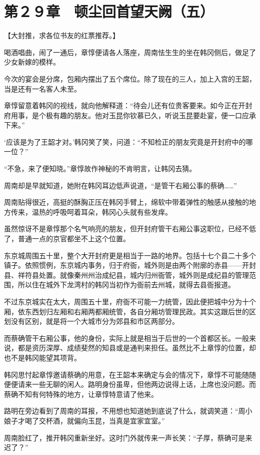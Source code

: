 \section{第２９章　顿尘回首望天阙（五）}

【大封推，求各位书友的红票推荐。】

喝酒唱曲，闹了一通后，章惇便请各人落座，周南怯生生的坐在韩冈侧后，做足了少女新嫁的模样。

今次的宴会是分席，包厢内摆出了五个席位。除了现在的三人，加上入宫的王韶，当是还有一名客人未至。

章惇留意着韩冈的视线，就向他解释道：“待会儿还有位贵客要来。如今正在开封府用事，是个极有趣的朋友。他对玉昆你钦慕已久，听说玉昆要赴宴，便一口应承下来。”

‘应该是为了王韶才对。’韩冈笑了笑，问道：“不知检正的朋友究竟是开封府中的哪一位？”

“不急，来了便知晓。”章惇故作神秘的不肯明言，让韩冈去猜。

周南却是早就知道，她附在韩冈耳边低声说道，“是管干右厢公事的蔡确……”

周南贴得很近，高挺的酥胸正压在韩冈手臂上，绵软中带着弹性的触感从接触的地方传来，温热的呼吸呵着耳朵，韩冈心头就有些发痒。

虽然惊讶不是章惇那个名气响亮的朋友，但开封府管干右厢公事这职位，已经不低了，普通一点的京官都坐不上这个位置。

东京城周围五十里，整个大开封府更是相当于一路的地界。包括十七个县二十多个镇子。依照惯例，东京城内事务，归于府衙，城外则是由两个附廓的赤县——开封县、祥符县处置。就像秦州州治成纪县，城内归州衙管，城外则是成纪县的管理范围，所以住在城外下龙湾村的韩冈当初作为衙前去州城，就得去县衙报道。

不过东京城实在太大，周围五十里，府衙不可能一力统管，因此便把城中分为十个厢，依东西划归左厢和右厢两都厢统管，各自分厢坊管理民政。其实这跟后世的区划没有区别，就是将一个大城市分为郊县和市区两部分。

而蔡确管干右厢公事，他的身份，实际上就是相当于后世的一个首都区长。一般来说，都是资历深厚、成绩斐然的知县或是通判来担任。虽然比不上章惇的位置，却也不是韩冈能望其项背。

韩冈思忖起章惇邀请蔡确的用意，在王韶本来确定与会的情况下，章惇不可能随随便便请来一些无聊的闲人。路明身份虽卑，但他两边说得上话，上席也没问题。而蔡确不知有何特殊的地方，让章惇特意请了他来。

路明在旁边看到了周南的耳报，不用想也知道她到底说了什么，就调笑道：“周小娘子才喝了交杯酒，就偏向玉昆，当真是宜家宜室。”

周南脸红了，推开韩冈重新坐好。这时门外就传来一声长笑：“子厚，蔡确可是来迟了？”

